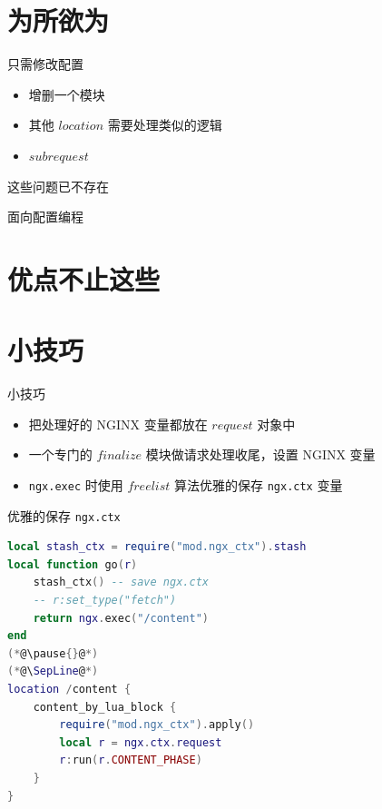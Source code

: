 \documentclass[aspectratio=32]{beamer}
\begin{document}
\section{为所欲为}

\begin{frame}{只需修改配置}
\begin{itemize}
  \item \alert{增删}一个模块
  \item 其他 $location$ 需要处理\alert{类似}的逻辑
  \item $subrequest$
\end{itemize}
\pause{}
\centerline{\LARGE 这些问题已不存在}
\end{frame}

\begin{frame}[standout]
面向配置编程
\end{frame}

\section{优点不止这些}

\begin{frame}[standout]
\end{frame}

\section{小技巧}

\begin{frame}{小技巧}
\begin{itemize}
  \item 把处理好的 NGINX 变量都放在 $request$ 对象中
  \item 一个专门的 $finalize$ 模块做请求处理收尾，设置 NGINX 变量
  \item \lstinline|ngx.exec| 时使用 $freelist$ 算法优雅的保存 \lstinline|ngx.ctx| 变量
\end{itemize}
\end{frame}

\begin{frame}[fragile]{优雅的保存 \lstinline|ngx.ctx|}
\small
\begin{lstlisting}[language=lua]
local stash_ctx = require("mod.ngx_ctx").stash
local function go(r)
    stash_ctx() -- save ngx.ctx
    -- r:set_type("fetch")
    return ngx.exec("/content")
end
(*@\pause{}@*)
(*@\SepLine@*)
location /content {
    content_by_lua_block {
        require("mod.ngx_ctx").apply()
        local r = ngx.ctx.request
        r:run(r.CONTENT_PHASE)
    }
}
\end{lstlisting}
\end{frame}
\end{document}
